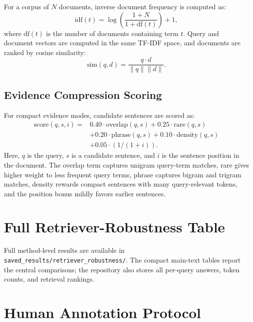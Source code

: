 \documentclass[11pt]{article}
\begin{document}
For a corpus of $N$ documents, inverse document frequency is computed as:
\begin{equation}
\mathrm{idf}(t) = \log\left(\frac{1 + N}{1 + \mathrm{df}(t)}\right) + 1,
\end{equation}
where $\mathrm{df}(t)$ is the number of documents containing term $t$. Query and document vectors are computed in the same TF-IDF space, and documents are ranked by cosine similarity:
\begin{equation}
\mathrm{sim}(q,d) = \frac{q \cdot d}{\lVert q \rVert \lVert d \rVert}.
\end{equation}

\subsection{Evidence Compression Scoring}
\label{app:evidence-scoring}

For compact evidence modes, candidate sentences are scored as:
\begin{equation}
\begin{split}
\mathrm{score}(q,s,i) ={}& 0.40 \cdot \mathrm{overlap}(q,s)
+ 0.25 \cdot \mathrm{rare}(q,s) \\
&+ 0.20 \cdot \mathrm{phrase}(q,s)
+ 0.10 \cdot \mathrm{density}(q,s) \\
&+ 0.05 \cdot (1 / (1 + i)).
\end{split}
\end{equation}
Here, $q$ is the query, $s$ is a candidate sentence, and $i$ is the sentence position in the document. The overlap term captures unigram query-term matches, rare gives higher weight to less frequent query terms, phrase captures bigram and trigram matches, density rewards compact sentences with many query-relevant tokens, and the position bonus mildly favors earlier sentences.

\section{Full Retriever-Robustness Table}

Full method-level results are available in \texttt{saved\_results/retriever\_robustness/}. The compact main-text tables report the central comparisons; the repository also stores all per-query answers, token counts, and retrieval rankings.

\section{Human Annotation Protocol}
\label{app:annotation-protocol}
\end{document}
